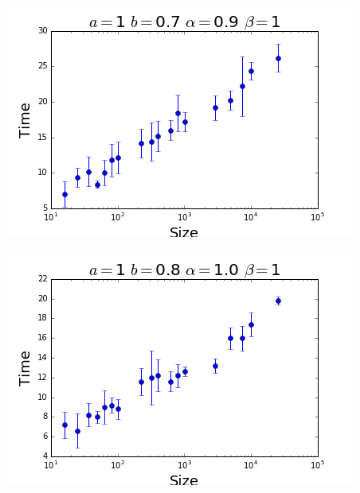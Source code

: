 \begin{figure}[h]
  \centering
  \begin{subfigure}[b]{0.4\linewidth}
    \includegraphics[width=\linewidth]{images/appendix/bestfit/confirm5.png}
  \end{subfigure}
  \begin{subfigure}[b]{0.4\linewidth}
    \includegraphics[width=\linewidth]{images/appendix/bestfit/confirm6.png}
  \end{subfigure}
\end{figure}